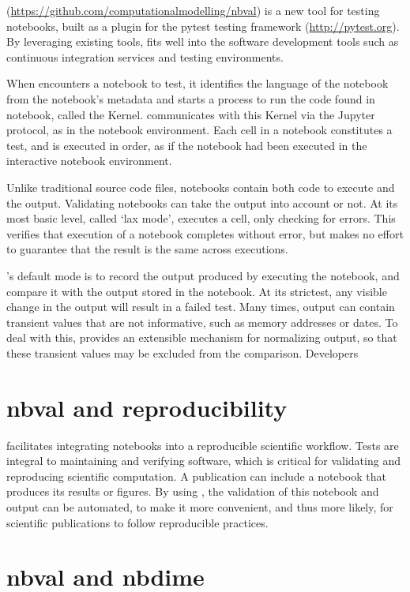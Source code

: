 \documentclass{deliverablereport}
\begin{document}
\nbval (\url{https://github.com/computationalmodelling/nbval}) is a new tool for testing notebooks, built as a plugin for the pytest testing framework (\url{http://pytest.org}).
By leveraging existing tools,
\nbval fits well into the software development tools such as continuous integration services and testing environments.

When \nbval encounters a notebook to test, it identifies the language of the notebook from the notebook's metadata and starts a process to run the code found in notebook, called the Kernel.
\nbval communicates with this Kernel via the Jupyter protocol, as in the notebook environment.
Each cell in a notebook constitutes a test, and is executed in order,
as if the notebook had been executed in the interactive notebook environment.

Unlike traditional source code files,
notebooks contain both code to execute and the output.
Validating notebooks can take the output into account or not.
At its most basic level, called `lax mode', \nbval executes a cell, only checking for errors.
This verifies that execution of a notebook completes without error,
but makes no effort to guarantee that the result is the same across executions.

\nbval's default mode is to record the output produced by executing the notebook,
and compare it with the output stored in the notebook.
At its strictest, any visible change in the output will result in a failed test.
Many times, output can contain transient values that are not informative,
such as memory addresses or dates.
To deal with this, \nbval provides an extensible mechanism for normalizing output,
so that these transient values may be excluded from the comparison.
Developers 


\section{nbval and reproducibility} %

\nbval facilitates integrating notebooks into a reproducible scientific workflow.
Tests are integral to maintaining and verifying software,
which is critical for validating and reproducing scientific computation.
A publication can include a notebook that produces its results or figures.
By using \nbval, the validation of this notebook and output can be automated,
to make it more convenient, and thus more likely,
for scientific publications to follow reproducible practices.


\section{nbval and nbdime} %
\end{document}
